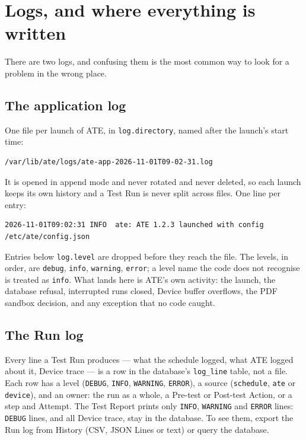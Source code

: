\chapter{Logs, and where everything is written}\label{ch:logs}

There are two logs, and confusing them is the most common way to look for a problem in the wrong
place.

\section{The application log}

One file per launch of ATE, in \texttt{log.directory}, named after the launch's start time:

\begin{lstlisting}[language=ATEShell]
/var/lib/ate/logs/ate-app-2026-11-01T09-02-31.log
\end{lstlisting}

It is opened in append mode and never rotated and never deleted, so each launch keeps its own
history and a Test Run is never split across files. One line per entry:

\begin{lstlisting}[language=ATEShell]
2026-11-01T09:02:31 INFO  ate: ATE 1.2.3 launched with config /etc/ate/config.json
\end{lstlisting}

Entries below \texttt{log.level} are dropped before they reach the file. The levels, in order, are
\texttt{debug}, \texttt{info}, \texttt{warning}, \texttt{error}; a level name the code does not
recognise is treated as \texttt{info}. What lands here is ATE's own activity: the launch, the
database refusal, interrupted runs closed, Device buffer overflows, the PDF sandbox decision, and
any exception that no code caught.

\section{The Run log}

Every line a Test Run produces --- what the schedule logged, what ATE logged about it, Device trace
--- is a row in the database's \texttt{log\_line} table, not a file. Each row has a level
(\texttt{DEBUG}, \texttt{INFO}, \texttt{WARNING}, \texttt{ERROR}), a source (\texttt{schedule},
\texttt{ate} or \texttt{device}), and an owner: the run as a whole, a Pre-test or Post-test Action,
or a step and Attempt. The Test Report prints only \texttt{INFO}, \texttt{WARNING} and \texttt{ERROR}
lines: \texttt{DEBUG} lines, and all Device trace, stay in the database. To see them, export the Run
log from History (CSV, JSON Lines or text) or query the database.

